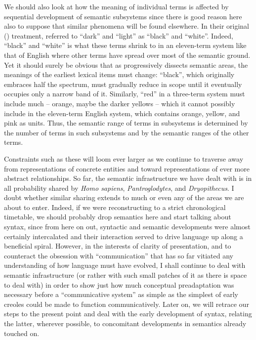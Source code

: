We should also look at how the meaning of individual terms is affected by sequential development of semantic subsystems since there is good reason here also to suppose that similar phenomena will be found elsewhere. In their original (\citeyear{Berlin1969}) treatment, \citeauthor{Berlin1969} referred to ``dark'' and ``light'' as ``black'' and ``white''. Indeed, ``black'' and ``white'' is what these terms shrink to in an eleven-term system like that of English where other terms have spread over most of the semantic ground. Yet it should surely be obvious that as  progressively dissects semantic areas, the meanings of the earliest lexical items must change: ``black'', which originally embraces half the spectrum, must gradually reduce in scope until it eventually occupies only a narrow band of it. Similarly, ``red'' in a three-term system must include much -- orange, maybe the darker yellows -- which it cannot possibly include in the eleven-term English system, which contains orange, yellow, and pink as units. Thus, the semantic range of terms in subsystems is determined by the number of terms in such subsystems and by the semantic ranges of the other terms.

Constraints such as these will loom ever larger as we continue to traverse  away from representations of concrete entities and toward representations of ever more abstract relationships. So far, the semantic infrastructure we have dealt with is in all probability shared by \textit{Homo sapiens}, \textit{Pantroglodytes}, and \textit{Dryopithecus}. I doubt whether similar sharing extends to much or even any of the areas we are about to enter. Indeed, if we were reconstructing to a strict chrono\-logical timetable, we should probably drop semantics here and start talking about syntax, since from here on out, syntactic and semantic developments were almost certainly intercalated and their interaction served to drive language up along a beneficial spiral. However, in the interests of clarity of presentation, and to counteract the obsession with ``communication'' that has so far vitiated any understanding
of how language must have evolved, I shall continue to deal with semantic infrastructure (or rather with such small patches of it as there is space to deal with) in order to show just how much conceptual preadaptation was necessary before a ``communicative system'' as simple as the simplest of early creoles could be made to function communicatively. Later on, we will retrace our steps to the present point and deal with the early development of syntax, relating the latter, wherever possible, to concomitant developments in semantics already touched on.%

